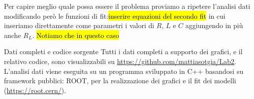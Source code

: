 \documentclass[
    rmp,
    floatfix,
    reprint, 
    superscriptaddress, 
    altaffilletter, 
    amsmath, 
    amssymb, 
    a4paper]{revtex4-2}
\begin{document}

Per capire meglio quale possa essere il problema proviamo a ripetere l'analisi dati modificando però le funzioni di fit:\hl{inserire equazioni del secondo fit} in cui inseriamo direttamente come parametri i valori di $R$, $L$ e $C$ aggiungendo in più anche $R_L$. \hl{Notiamo che in questo caso}





\begin{methods}{D\lowercase{ati completi e codice sorgente}}
    Tutti i dati completi a supporto dei grafici, e il relativo codice, sono visualizzabili su \url{https://github.com/mattiasotgia/Lab2}. L'analisi dati viene eseguita su un programma sviluppato in C++ basandosi su framework pubblici: ROOT, per la realizzazione dei grafici e il fit dei modelli (\url{https://root.cern/}).
\end{methods}


\appendix

\renewcommand{\thetable}{S-\arabic{table}}

\end{document}
